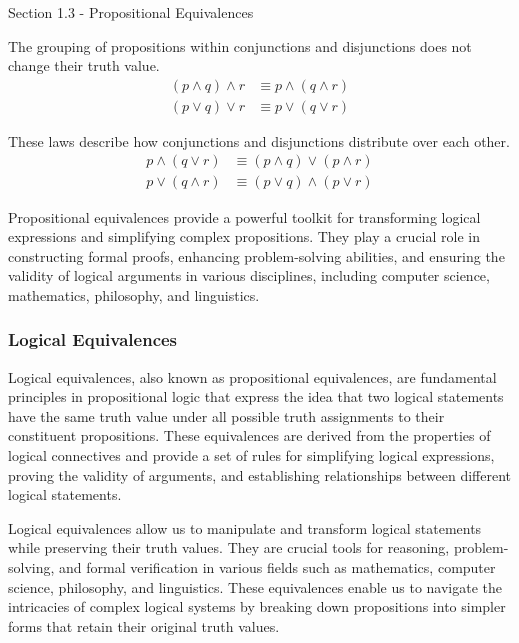 \begin{notes}{Section 1.3 - Propositional Equivalences}
    \begin{Highlight}
        The grouping of propositions within conjunctions and disjunctions does not change their truth value.
        \begin{align*}
            (p \wedge q) \wedge r & \equiv p \wedge (q \wedge r) \\
            (p \vee q) \vee r & \equiv p \vee (q \vee r)
        \end{align*}
    \end{Highlight}

    \begin{Highlight}
        These laws describe how conjunctions and disjunctions distribute over each other.
        \begin{align*}
            p \wedge (q \vee r) & \equiv (p \wedge q) \vee (p \wedge r) \\
            p \vee (q \wedge r) & \equiv (p \vee q) \wedge (p \vee r)
        \end{align*}
    \end{Highlight}

    Propositional equivalences provide a powerful toolkit for transforming logical expressions and simplifying complex propositions. They play a crucial role in constructing formal proofs, enhancing 
    problem-solving abilities, and ensuring the validity of logical arguments in various disciplines, including computer science, mathematics, philosophy, and linguistics.

    \subsubsection*{Logical Equivalences}

    Logical equivalences, also known as propositional equivalences, are fundamental principles in propositional logic that express the idea that two logical statements have the same truth value under 
    all possible truth assignments to their constituent propositions. These equivalences are derived from the properties of logical connectives and provide a set of rules for simplifying logical 
    expressions, proving the validity of arguments, and establishing relationships between different logical statements.

    Logical equivalences allow us to manipulate and transform logical statements while preserving their truth values. They are crucial tools for reasoning, problem-solving, and formal verification in 
    various fields such as mathematics, computer science, philosophy, and linguistics. These equivalences enable us to navigate the intricacies of complex logical systems by breaking down propositions 
    into simpler forms that retain their original truth values.


\end{notes}
